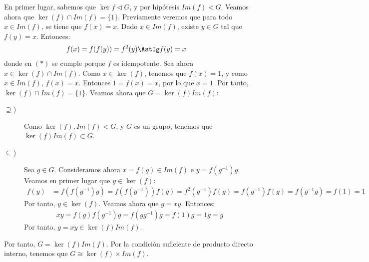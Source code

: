 \begin{ejercicio}
\begin{description}
        En primer lugar, sabemos que $\ker f \lhd G$, y por hipótesis $Im(f)\lhd G$. Veamos ahora que $\ker (f) \cap Im(f)=\{1\}$. Previamente veremos que para todo $x\in Im(f)$, se tiene que $f(x)=x$. Dado $x\in Im(f)$, existe $y\in G$ tal que $f(y)=x$. Entonces:
        \begin{align*}
            f(x) &= f(f(y)) = f^2(y) \AstIg f(y) = x
        \end{align*}
        donde en $(\ast)$ se cumple porque $f$ es idempotente. Sea ahora $x\in \ker(f)\cap Im(f)$. Como $x\in \ker(f)$, tenemos que $f(x)=1$, y como $x\in Im(f)$, $f(x)=x$. Entonces $1=f(x)=x$, por lo que $x=1$. Por tanto, $\ker(f)\cap Im(f)=\{1\}$.
        Veamos ahora que $G=\ker(f)Im(f)$:
        \begin{description}
            \item[$\supseteq$)] Como $\ker(f),Im(f)<G$, y $G$ es un grupo, tenemos que $\ker(f)Im(f)\subset G$.
            \item[$\subseteq$)] Sea $g\in G$. Consideramos ahora $x=f(g)\in Im(f)$ e $y=f(g^{-1})g$. Veamos en primer lugar que $y\in \ker(f)$:
            \begin{align*}
                f(y) &= f(f(g^{-1})g) = f(f(g^{-1}))f(g) = f^2(g^{-1})f(g)
                = f(g^{-1})f(g) = f(g^{-1}g) = f(1) = 1
            \end{align*}
            Por tanto, $y\in \ker(f)$. Veamos ahora que $g=xy$. Entonces:
            \begin{align*}
                xy = f(g)f(g^{-1})g = f(gg^{-1})g = f(1)g = 1g = g
            \end{align*}
            Por tanto, $g=xy\in \ker(f)Im(f)$.
        \end{description}

        Por tanto, $G=\ker(f)Im(f)$. Por la condición suficiente de producto directo interno, tenemos que $G\cong \ker(f)\times Im(f)$.
        

    \end{description}
\end{ejercicio}

